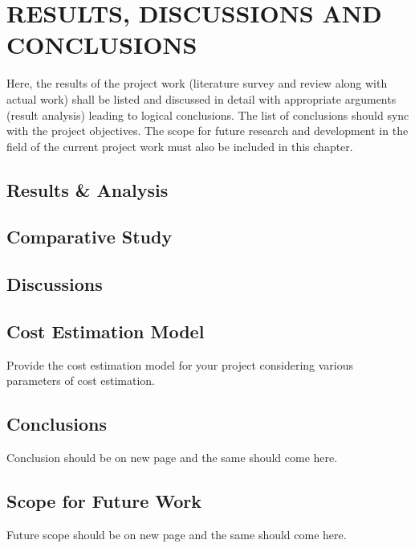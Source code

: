 \chapter{RESULTS, DISCUSSIONS AND CONCLUSIONS} %
\label{ChapterResults} %

Here, the results of the project work (literature survey and review along with actual work) shall be listed and discussed in detail with appropriate arguments (result analysis) leading to logical conclusions. The list of conclusions should sync with the project objectives. The scope for future research and development in the field of the current project work must also be included in this chapter. 

\section{Results \& Analysis}

\section{Comparative Study}

\section{Discussions}

\section{Cost Estimation Model}
Provide the cost estimation model for your project considering various parameters of cost estimation. 
\pagebreak
\section{Conclusions}
Conclusion should be on new page and the same should come here.

\pagebreak
\section{Scope for Future Work}
Future scope should be on new page and the same should come here.

\pagebreak


	
	






